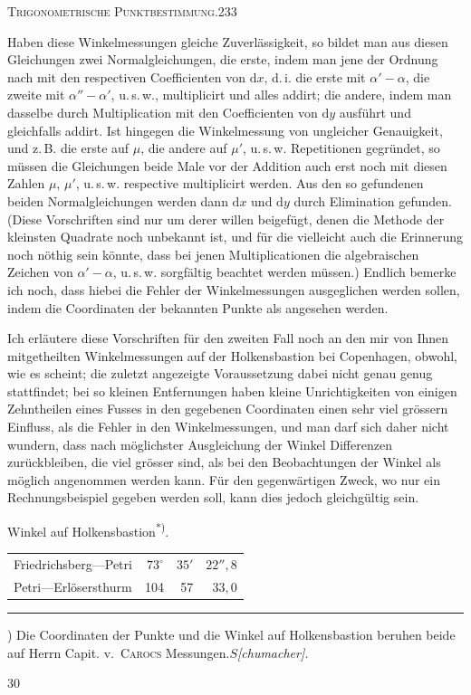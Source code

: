 \clearpage
\noindent\mbox{}\hfill\textsc{Trigonometrische Punktbestimmung.}\hfill233\par\medskip
Haben diese Winkelmessungen gleiche Zuverlässigkeit, so bildet man aus diesen Gleichungen zwei Normalgleichungen, die erste, indem man jene der Ordnung nach mit den respectiven Coefficienten von $\mathrm dx$, d.\,i. die erste mit $\alpha'-\alpha$, die zweite mit $\alpha''-\alpha'$, u.\,s.\,w., multiplicirt und alles addirt; die andere, indem man dasselbe durch Multiplication mit den Coefficienten von $\mathrm dy$ ausführt und gleichfalls addirt. Ist hingegen die Winkelmessung von ungleicher Genauigkeit, und z.\,B. die erste auf $\mu$, die andere auf $\mu'$, u.\,s.\,w. Repetitionen gegründet, so müssen die Gleichungen beide Male vor der Addition auch erst noch mit diesen Zahlen $\mu$, $\mu'$, u.\,s.\,w. respective multiplicirt werden. Aus den so gefundenen beiden Normalgleichungen werden dann $\mathrm dx$ und $\mathrm dy$ durch Elimination gefunden. (Diese Vorschriften sind nur um derer willen beigefügt, denen die Methode der kleinsten Quadrate noch unbekannt ist, und für die vielleicht auch die Erinnerung noch nöthig sein könnte, dass bei jenen Multiplicationen die algebraischen Zeichen von $\alpha'-\alpha$, u.\,s.\,w. sorgfältig beachtet werden müssen.) Endlich bemerke ich noch, dass hiebei  die Fehler der Winkelmessungen ausgeglichen werden sollen, indem die Coordinaten der bekannten Punkte als  angesehen werden.

Ich erläutere diese Vorschriften für den zweiten Fall noch an den mir von Ihnen mitgetheilten Winkelmessungen auf der Holkensbastion bei Copenhagen, obwohl, wie es scheint; die zuletzt angezeigte Voraussetzung dabei nicht genau genug stattfindet; bei so kleinen Entfernungen haben kleine Unrichtigkeiten von einigen Zehntheilen eines Fusses in den gegebenen Coordinaten einen sehr viel grössern Einfluss, als die Fehler in den Winkelmessungen, und man darf sich daher nicht wundern, dass nach möglichster Ausgleichung der Winkel Differenzen zurückbleiben, die viel grösser sind, als bei den Beobachtungen der Winkel als möglich angenommen werden kann. Für den gegenwärtigen Zweck, wo nur ein Rechnungsbeispiel gegeben werden soll, kann dies jedoch gleichgültig sein.
\begin{center}
Winkel auf Holkensbastion\textsuperscript{*)}.
\end{center}
\begin{center}
\begin{tabular}{lrrr}
Friedrichsberg---Petri&$73^\circ$&$35'$&$22''{,}8$\\
Petri---Erlösersthurm&104&57&$33{,}0$
\end{tabular}
\end{center}
\vfill
\noindent\rule{4cm}{.4pt}\par
{\footnotesize *) Die Coordinaten der Punkte und die Winkel auf Holkensbastion beruhen beide auf Herrn Capit. v.~\textsc{Carocs} Messungen.\quad $S$\textit{[chumacher].}\par}
\medskip{}\hfill30\hspace*{2cm}

